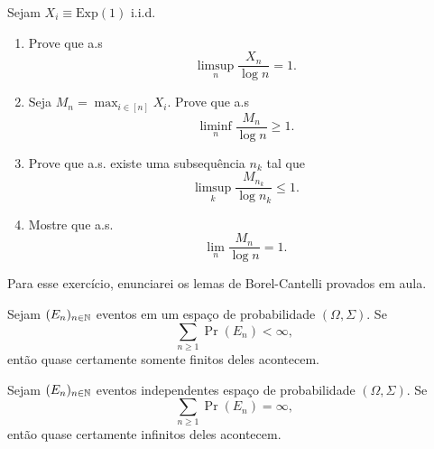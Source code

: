 \begin{exercise}
	Sejam $X_i \equiv \text{Exp}(1)$ i.i.d.
	\begin{enumerate}[label=(\alph*)]
		\item Prove que a.s
			\[ \limsup_n \frac{X_n}{\log n} = 1.\]
		\item Seja $M_n = \max_{i \in [n]} X_i$. Prove que a.s
			\[ \liminf_n \frac{M_n}{\log n} \geq 1.\]
		\item Prove que a.s. existe uma subsequência $n_k$ tal que
			\[ \limsup_k \frac{M_{n_k}}{\log n_k} \leq 1.\]
		\item Mostre que a.s.
			\[
				\lim_n \frac{M_n}{\log n} = 1.
			\]
	\end{enumerate}

\end{exercise}
Para esse exercício, enunciarei os lemas de Borel-Cantelli provados em aula.
\begin{lemma}
	\label{lemma:borel_cantelli_1}
	Sejam $(E_n)_{n \in \mathbb{N}}$ eventos em um espaço de probabilidade
	$(\Omega, \Sigma)$. Se
	\[
		\sum_{n \geq 1} \Pr(E_n) < \infty,
	\]
	então quase certamente somente finitos deles acontecem.
\end{lemma}

\begin{lemma}
	\label{lemma:borel_cantelli_2}
	Sejam $(E_n)_{n \in \mathbb{N}}$ eventos independentes espaço de
	probabilidade $(\Omega, \Sigma)$. Se
	\[
		\sum_{n \geq 1} \Pr(E_n) = \infty,
	\]
	então quase certamente infinitos deles acontecem.
\end{lemma}

